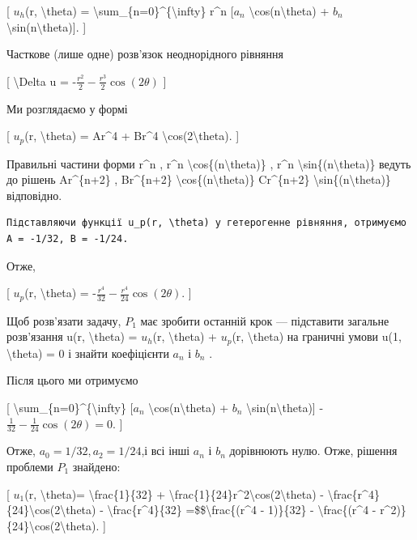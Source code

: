\documentclass[
]{article}
\begin{document}
{{{{[} \(u_h\)(r, \textbackslash theta) =
\textbackslash sum\_\{n=0\}\^{}\{\textbackslash infty\} r\^{}n
{[}\(a_n\) \textbackslash cos(n\textbackslash theta) + \(b_n\)
\textbackslash sin(n\textbackslash theta){]}. {]}

Часткове (лише одне) розв'язок неоднорідного рівняння

{[} \textbackslash Delta u =
-\(\frac{r^2}{2} - \frac{r^3}{2} \cos{(2\theta)}\) {]}

Ми розглядаємо у формі

{[} \(u_p\)(r, \textbackslash theta) = Ar\^{}4 + Br\^{}4
\textbackslash cos(2\textbackslash theta). {]}

Правильні частини форми r\^{}n , r\^{}n
\textbackslash cos\{(n\textbackslash theta)\} , r\^{}n
\textbackslash sin\{(n\textbackslash theta)\} ведуть до рішень
Ar\^{}\{n+2\} , Br\^{}\{n+2\}
\textbackslash cos\{(n\textbackslash theta)\} Cr\^{}\{n+2\}
\textbackslash sin\{(n\textbackslash theta)\} відповідно.

\begin{verbatim}
Підставляючи функції u_p(r, \theta) у гетерогенне рівняння, отримуємо A = -1/32, B = -1/24.
\end{verbatim}

Отже,

{[} \(u_p\)(r, \textbackslash theta) =
-\(\frac{r^4}{32} - \frac{r^4}{24} \cos(2\theta)\). {]}

Щоб розв'язати задачу, \(P_1\) має зробити останній крок --- підставити
загальне розв'язання u(r, \textbackslash theta) = \(u_h\)(r,
\textbackslash theta) + \(u_p\)(r, \textbackslash theta) на граничні
умови u(1, \textbackslash theta) = 0 і знайти коефіцієнти \(a_n\) і
\(b_n\) .

Після цього ми отримуємо

{[} \textbackslash sum\_\{n=0\}\^{}\{\textbackslash infty\} {[}\(a_n\)
\textbackslash cos(n\textbackslash theta) + \(b_n\)
\textbackslash sin(n\textbackslash theta){]}
-\(\frac{1}{32} - \frac{1}{24} \cos(2\theta) = 0\). {]}

Отже, \(a_0=1/32 , a_2=1/24\),і всі інші \(a_n\) і \(b_n\) дорівнюють
нулю. Отже, рішення проблеми \(P_1\) знайдено:

{[} \(u_1\)(r, \textbackslash theta)= \textbackslash frac\{1\}\{32\} +
\textbackslash frac\{1\}\{24\}r\^{}2\textbackslash cos(2\textbackslash theta)
-
\textbackslash frac\{r\^{}4\}\{24\}\textbackslash cos(2\textbackslash theta)
- \textbackslash frac\{r\^{}4\}\{32\} =\$\$\textbackslash frac\{(r\^{}4
- 1)\}\{32\} - \textbackslash frac\{(r\^{}4 -
r\^{}2)\}\{24\}\textbackslash cos(2\textbackslash theta). {]}

}}}
\end{document}

